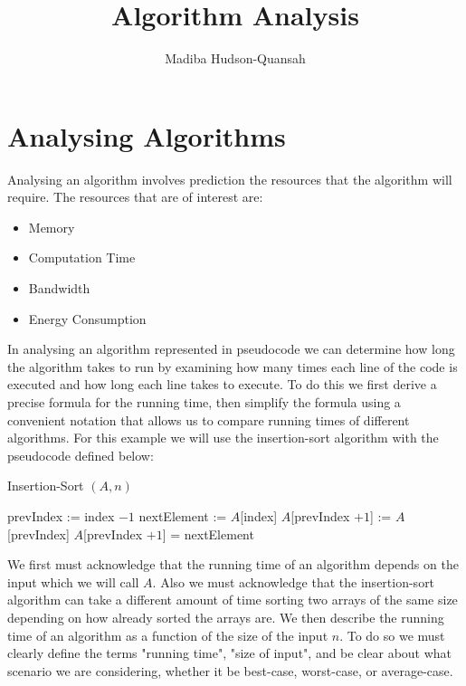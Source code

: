 \documentclass[12pt letter]{report}
\title{\Huge{Algorithm Analysis}}
\author{\huge{Madiba Hudson-Quansah}}
\date{}
\begin{document}
\maketitle
\newpage
{}
\tableofcontents
\pagebreak

\chapter{Analysing Algorithms}

Analysing an algorithm involves prediction the resources that the algorithm will require. The resources that are of interest are:
\begin{itemize}
  \item Memory
  \item Computation Time
  \item Bandwidth
  \item Energy Consumption
\end{itemize}

In analysing an algorithm represented in pseudocode we can determine how long the algorithm takes to run by examining
how many times each line of the code is executed  and how long each line takes to execute. To do this we first derive a
precise formula for the running time, then simplify the formula using a convenient notation that allows us to compare
running times of different algorithms. For this example we will use the insertion-sort algorithm with the pseudocode
defined below:

\begin{algorithm}[H]
  \caption{Insertion-Sort $\left( A,n \right) $}
  \begin{algorithmic}[1]
    \State prevIndex := index $- 1$
    \State nextElement := $A$[index]
    \State $A$[prevIndex $+ 1$] := $A$[prevIndex]
    \EndWhile
    \State     $A$[prevIndex $ + 1$] = nextElement
    \EndFor
  \end{algorithmic}
\end{algorithm}


We first must acknowledge that the running time of an algorithm depends on the input which we will call $A$. Also we
must acknowledge that the insertion-sort algorithm can take a different amount of time sorting two arrays of the same
size depending on how already sorted the arrays are. We then describe the running time of an algorithm as a function of
the size of the input $n$. To do so we must clearly define the terms "running time", "size of input", and be clear about
what scenario we are considering, whether it be best-case, worst-case, or average-case.
\end{document}

